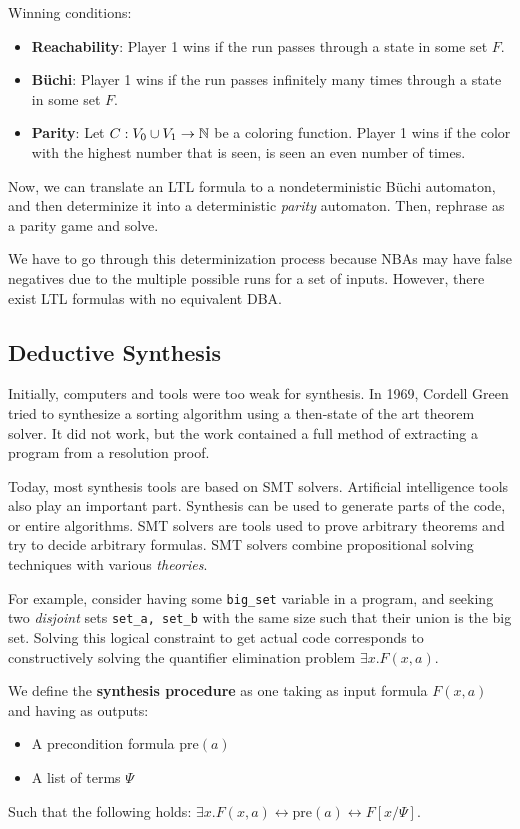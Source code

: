 Winning conditions:
\begin{itemize}
\item \textbf{Reachability}: Player 1 wins if the run passes through a state in some set $F$.
\item \textbf{B\"uchi}: Player 1 wins if the run passes infinitely many times through a state in some set $F$.
\item \textbf{Parity}: Let $C: V_0 \cup V_1 \to \mathbb{N}$ be a coloring function. 
Player 1 wins if the color with the highest number that is seen, is seen an even number of times.
\end{itemize}

Now, we can translate an LTL formula to a nondeterministic B\"uchi automaton, and then determinize it
into a deterministic \emph{parity} automaton. Then, rephrase as a parity game and solve.

We have to go through this determinization process because NBAs may have false negatives due to
the multiple possible runs for a set of inputs. However, there exist LTL formulas with no
equivalent DBA.

\subsection{Deductive Synthesis}
Initially, computers and tools were too weak for synthesis. In 1969, Cordell Green tried
to synthesize a sorting algorithm using a then-state of the art theorem solver.
It did not work, but the work contained a full method of extracting a program from a resolution
proof.

Today, most synthesis tools are based on SMT solvers. Artificial intelligence tools also play an important part.
Synthesis can be used to generate parts of the code, or entire algorithms. SMT solvers are
tools used to prove arbitrary theorems and try to decide arbitrary formulas. SMT solvers combine
propositional solving techniques with various \emph{theories}.

For example, consider having some \lstinline{big_set} variable in a program, and seeking
two \emph{disjoint} sets \lstinline{set_a, set_b} with the same size such that their union
is the big set. Solving this logical constraint to get actual code corresponds to constructively solving
the quantifier elimination problem $\exists x. F(x, a)$.

We define the \textbf{synthesis procedure} as one taking as input formula $F(x, a)$ and having
as outputs:
\begin{itemize}
\item A precondition formula $\mathrm{pre}(a)$
\item A list of terms $\Psi$
\end{itemize}
Such that the following holds: $\exists x. F(x, a) \leftrightarrow \mathrm{pre}(a) \leftrightarrow F[x/\Psi]$.

